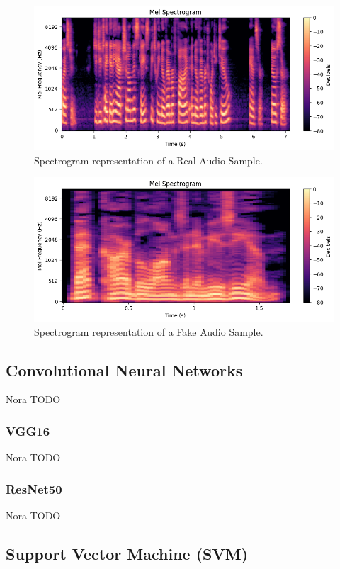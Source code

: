 \documentclass[conference]{IEEEtran}
\begin{document}
\begin{figure}
  \centering
  \includegraphics[width=\linewidth]{images/real_spectrogram.png}
  \caption{Spectrogram representation of a Real Audio Sample.}
  \label{fig:real_spectrogram}
\end{figure}

\begin{figure}
  \centering
  \includegraphics[width=\linewidth]{images/fake_spectrogram.png}
  \caption{Spectrogram representation of a Fake Audio Sample.}
  \label{fig:fake_spectrogram}
\end{figure}

\subsection{Convolutional Neural Networks}
Nora TODO
\subsubsection{VGG16}
Nora TODO
\subsubsection{ResNet50}
Nora TODO

\subsection{Support Vector Machine (SVM)}
\end{document}
